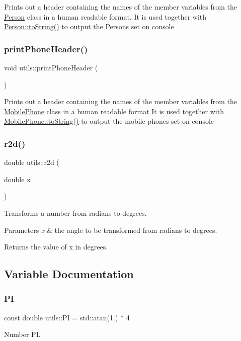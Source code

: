 Prints out a header containing the names of the member variables from the \hyperlink{class_person}{Person} class in a human readable format. It is used together with \hyperlink{class_person_a68872538da519d0a04297f43376db27c}{Person\+::to\+String()} to output the Persons set on console \mbox{\label{namespaceutils_a7633a4dfe509a009f4e02850b03ba1e4}} 
\subsubsection{\texorpdfstring{print\+Phone\+Header()}{printPhoneHeader()}}
{\footnotesize\ttfamily void utils\+::print\+Phone\+Header (\begin{DoxyParamCaption}{ }\end{DoxyParamCaption})}

Prints out a header containing the names of the member variables from the \hyperlink{class_mobile_phone}{Mobile\+Phone} class in a human readable format It is used together with \hyperlink{class_mobile_phone_a2b7e556d12a43e380786ad0eccf3ce04}{Mobile\+Phone\+::to\+String()} to output the mobile phones set on console \mbox{\label{namespaceutils_af70f6f3c2ac66aa3b4ce64a3b48288cb}} 
\subsubsection{\texorpdfstring{r2d()}{r2d()}}
{\footnotesize\ttfamily double utils\+::r2d (\begin{DoxyParamCaption}\item[{double}]{x }\end{DoxyParamCaption})\hspace{0.3cm}{\ttfamily [inline]}}

Transforms a number from radians to degrees. 
\begin{DoxyParams}{Parameters}
{\em x} & the angle to be transformed from radians to degrees. \\
\hline
\end{DoxyParams}
\begin{DoxyReturn}{Returns}
the value of x in degrees. 
\end{DoxyReturn}


\subsection{Variable Documentation}
\mbox{\label{namespaceutils_a92ce7d254229929886551de7417e1912}} 
\subsubsection{\texorpdfstring{PI}{PI}}
{\footnotesize\ttfamily const double utils\+::\+PI = std\+::atan(1.) $\ast$ 4}

Number PI. 
